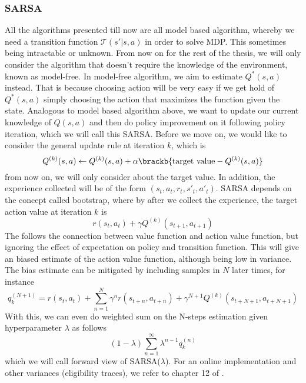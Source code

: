 \subsubsection{SARSA}
All the algorithms presented till now are all model based algorithm, whereby we need a transition function $\mathcal{T}(s'|s, a)$ in order to solve MDP. This sometimes being intractable or unknown. From now on for the rest of the thesis, we will only consider the algorithm that doesn't require the knowledge of the environment, known as model-free. In model-free algorithm, we aim to estimate $Q^*(s, a)$ instead. That is because choosing action will be very easy if we get hold of $Q^*(s, a)$ simply choosing the action that maximizes the function given the state. Analogous to model based algorithm above, we want to update our current knowledge of $Q(s, a)$ and then do policy improvement on it following policy iteration, which we will call this SARSA. Before we move on, we would like to consider the general update rule at iteration $k$, which is 
\begin{equation}
    \label{eqn:train-q-val}
    Q^{(k)}(s, a) \leftarrow Q^{(k)}(s, a) + \alpha\brackb{\text{target value} - Q^{(k)}(s, a)}
\end{equation}
from now on, we will only consider about the target value. In addition, the experience collected will be of the form $(s_{t}, a_{t}, r_{t}, s'_{t}, a'_{t})$. SARSA depends on the concept called bootstrap, where by after we collect the experience, the target action value at iteration $k$ is
\begin{equation}
    r(s_t, a_t) + \gamma Q^{(k)}(s_{t+1}, a_{t+1})
\end{equation}
The follows the connection between value function and action value function, but ignoring the effect of expectation on policy and transition function. This will give an biased estimate of the action value function, although being low in variance. The bias estimate can be mitigated by including samples in $N$ later times, for instance 
\begin{equation}
    q^{(N+1)}_k = r(s_t, a_t) + \sum^N_{n=1} \gamma^n r(s_{t+n}, a_{t+n}) + \gamma^{N+1} Q^{(k)}(s_{t+N+1}, a_{t+N+1})
\end{equation}
With this, we can even do weighted sum on the N-steps estimation given hyperparameter $\lambda$ as follows
\begin{equation}
    (1-\lambda)\sum^\infty_{n=1} \lambda^{n-1} q^{(n)}_k
\end{equation}
which we will call forward view of SARSA($\lambda$). For an online implementation and other variances (eligibility traces), we refer to chapter 12 of \cite{sutton2018reinforcement}. 

